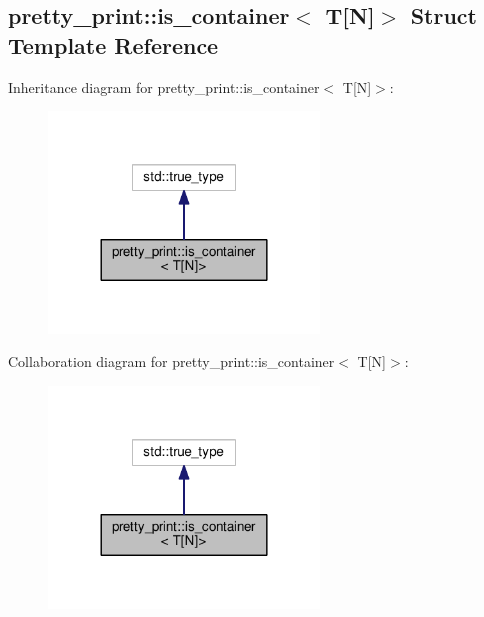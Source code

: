 \hypertarget{structpretty__print_1_1is__container_3_01T[N]_4}{}\subsection{pretty\+\_\+print\+:\+:is\+\_\+container$<$ T\mbox{[}N\mbox{]}$>$ Struct Template Reference}
\label{structpretty__print_1_1is__container_3_01T[N]_4}


Inheritance diagram for pretty\+\_\+print\+:\+:is\+\_\+container$<$ T\mbox{[}N\mbox{]}$>$\+:\nopagebreak
\begin{figure}[H]
\begin{center}
\leavevmode
\includegraphics[width=204pt]{structpretty__print_1_1is__container_3_01T[N]_4__inherit__graph}
\end{center}
\end{figure}


Collaboration diagram for pretty\+\_\+print\+:\+:is\+\_\+container$<$ T\mbox{[}N\mbox{]}$>$\+:\nopagebreak
\begin{figure}[H]
\begin{center}
\leavevmode
\includegraphics[width=204pt]{structpretty__print_1_1is__container_3_01T[N]_4__coll__graph}
\end{center}
\end{figure}



